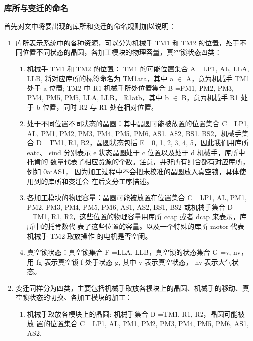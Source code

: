 \subsubsection{库所与变迁的命名}
首先对文中将要出现的库所和变迁的命名规则加以说明：
\begin{enumerate}
	\item 库所表示系统中的各种资源，可以分为机械手 TM1 和 TM2 的位置，处于不同位置不同状态的晶圆，各加工模块的物理容量，真空锁状态四类：
	      \begin{enumerate}
		      \item 机械手 TM1 和 TM2 的位置： TM1 的可能位置集合 A ={LP1, AL, LLA, LLB},
		            将对应库所的标签命名为 TM1ata，其中 a $\in$ A，意为机械手 TM1 处于 a 位置;
		            TM2 中 R1 机械手所处位置集合 B ={PM1, PM2, PM3, PM4, PM5, PM6,
		            LLA, LLB}， R1atb，其中 b $\in$ B，意为机械手 R1 处于 b 位置，同时 R2 与
		            R1 处在相对位置。
		      \item 处于不同位置不同状态的晶圆：其中晶圆可能被放置的位置集合 C ={LP1,
		            AL, PM1, PM2, PM3, PM4, PM5, PM6, AS1, AS2, BS1, BS2}，机械手集
		            合 D ={TM1, R1, R2}，晶圆状态包括 E ={0, 1, 2, 3, 4, 5}，因此我们用库所
		            eatc、 eind 分别表示 e 状态晶圆处于 c 位置以及处于 d 机械手，库所中托肯的
		            数量代表了相应资源的个数。注意，并非所有组合都有对应库所，例如 0atAS1，
		            因为加工过程中不会把未校准的晶圆放入真空锁，具体使用到的库所和变迁会
		            在后文分工序描述。
		      \item 各加工模块的物理容量：晶圆可能被放置在位置集合 C ={LP1, AL, PM1, PM2,
		            PM3, PM4, PM5, PM6, AS1, AS2, BS1, BS2} 或机械手集合 D ={TM1, R1,
		            R2}，这些位置的物理容量用库所 ccap 或者 dcap 来表示，库所中的托肯数代
		            表了这些位置的容量。以及一个特殊的库所 motor 代表机械手 TM2 取放操作
		            的电机是否空闲。
		      \item 真空锁状态：真空锁集合 F ={LLA, LLB}，真空锁的状态集合 G ={v, nv}，
		            用 fg 表示真空锁 f 处于状态 g, 其中 v 表示真空状态， nv 表示大气状态。
	      \end{enumerate}
	\item 变迁同样分为四类，主要包括机械手取放各模块上的晶圆、机械手的移动、真空锁状态的切换、各加工模块的加工：
	      \begin{enumerate}
		      \item 机械手取放各模块上的晶圆: 机械手集合 D ={TM1, R1, R2}，晶圆可能被放
		            置的位置集合 C ={LP1, AL, PM1, PM2, PM3, PM4, PM5, PM6, AS1, AS2,
}
\end{enumerate}
\end{enumerate}
